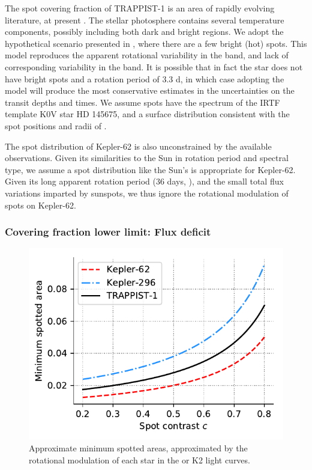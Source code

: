 The spot covering fraction of TRAPPIST-1 is an area of rapidly evolving literature, at present \citep{Rackham2018, Morris2018c, Zhang2018, Wakeford2019}. The stellar photosphere contains several temperature components, possibly including both dark and bright regions. We adopt the hypothetical scenario presented in \citet{Morris2018c}, where there are a few bright (hot) spots. This model reproduces the apparent rotational variability in the \kepler band, and lack of corresponding variability in the \spitzer band. It is possible that in fact the star does not have bright spots and a rotation period of 3.3 d, in which case adopting the \citet{Morris2018c} model will produce the most conservative estimates in the uncertainties on the transit depths and times. We assume spots have the spectrum of the IRTF template K0V star HD 145675, and a surface distribution consistent with the spot positions and radii of \citet{Morris2018c}.

The spot distribution of Kepler-62 is also unconstrained by the available observations. Given its similarities to the Sun in rotation period and spectral type, we assume a spot distribution like the Sun's is appropriate for Kepler-62. Given its long apparent rotation period (36 days, \citealt{Borucki2013}), and the small total flux variations imparted by sunspots, we thus ignore the rotational modulation of spots on Kepler-62.

\subsubsection{Covering fraction lower limit: Flux deficit}

\begin{figure}
\centering
\includegraphics[scale=0.8]{libra/flux_deficits.pdf}
\caption{Approximate minimum spotted areas, approximated by the rotational modulation of each star in the \kepler or K2 light curves. }
\label{fig:deficit}
\end{figure}

